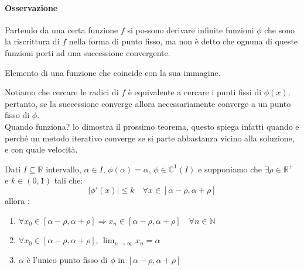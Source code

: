 \documentclass[12pt,a4paper,]{report}
\begin{document}
\paragraph{Osservazione}
Partendo da una certa funzione $f$ si possono derivare infinite funzioni $\phi$ che sono la riscrittura di $f$ nella forma di punto fisso, ma non è detto che ognuna di queste funzioni porti ad una successione convergente.
\begin{definizione}
    Elemento di una funzione che coincide con la sua immagine.
\end{definizione}
\noindent
Notiamo che cercare le radici  di $f$ è equivalente a cercare i punti fissi di $\phi(x)$, pertanto, se la successione converge allora necessariamente converge a un punto fisso di $\phi$.\\
\noindent
Quando funziona? lo dimostra il prossimo teorema, questo spiega infatti quando e perché un metodo iterativo converge se si parte abbastanza vicino alla soluzione, e con quale velocità.
\begin{teorema}
    Dati $I\subseteq \mathbb{R}$ intervallo, $\alpha \in I$, $\phi(\alpha) = \alpha$, $\phi \in \mathbb{C}^1(I)$ e supponiamo che $\exists \rho \in\mathbb{R}^+ $ e $k\in(0,1)$ tali che:
    \[
    |\phi'(x)| \leq k \quad\forall x \in [\alpha - \rho, \alpha + \rho] 
    \]
    allora :   
    \begin{enumerate}
        \item $\forall x_0 \in [\alpha - \rho, \alpha + \rho] \Rightarrow x_n \in [\alpha - \rho, \alpha + \rho] \quad\forall n\in\mathbb{N}$
        \item $\forall x_0 \in [\alpha - \rho, \alpha + \rho]$, $\lim_{n\to\infty} x_n = \alpha$
        \item $\alpha$ è l'unico punto fisso di $\phi$ in $[\alpha - \rho, \alpha + \rho]$
    \end{enumerate}
\end{teorema}
\end{document}
